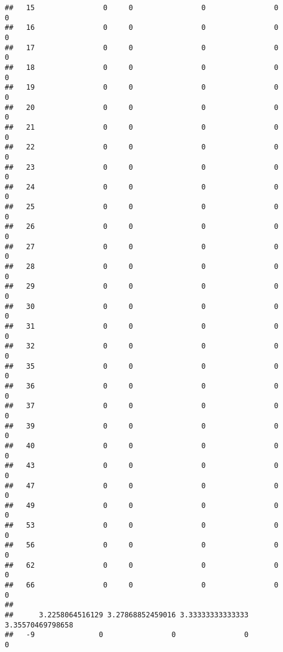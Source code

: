 \documentclass[]{article}
\begin{document}
\begin{verbatim}
##   15                0     0                0                0                0
##   16                0     0                0                0                0
##   17                0     0                0                0                0
##   18                0     0                0                0                0
##   19                0     0                0                0                0
##   20                0     0                0                0                0
##   21                0     0                0                0                0
##   22                0     0                0                0                0
##   23                0     0                0                0                0
##   24                0     0                0                0                0
##   25                0     0                0                0                0
##   26                0     0                0                0                0
##   27                0     0                0                0                0
##   28                0     0                0                0                0
##   29                0     0                0                0                0
##   30                0     0                0                0                0
##   31                0     0                0                0                0
##   32                0     0                0                0                0
##   35                0     0                0                0                0
##   36                0     0                0                0                0
##   37                0     0                0                0                0
##   39                0     0                0                0                0
##   40                0     0                0                0                0
##   43                0     0                0                0                0
##   47                0     0                0                0                0
##   49                0     0                0                0                0
##   53                0     0                0                0                0
##   56                0     0                0                0                0
##   62                0     0                0                0                0
##   66                0     0                0                0                0
##     
##      3.2258064516129 3.27868852459016 3.33333333333333 3.35570469798658
##   -9               0                0                0                0

\end{verbatim}
\end{document}
